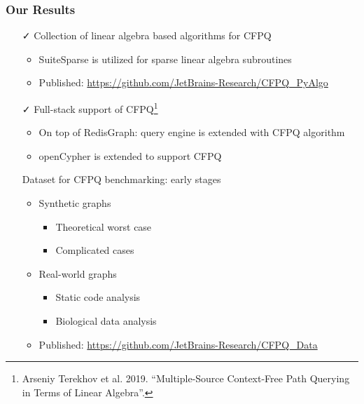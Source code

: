\documentclass[xcolor=table,aspectratio=169]{beamer}
\begin{document}
\begin{frame}[fragile]
  \frametitle{Our Results}

  \begin{itemize}
    \item[\faCheck] Collection of linear algebra based algorithms for CFPQ
    \begin{itemize}
      \item SuiteSparse is utilized for sparse linear algebra subroutines
      \item Published: \url{https://github.com/JetBrains-Research/CFPQ_PyAlgo}
    \end{itemize}
    \pause
    \item[\faCheck] Full-stack support of CFPQ\footnote{Arseniy Terekhov et al. 2019. ``Multiple-Source Context-Free Path Querying in Terms of Linear Algebra''.}    
    \begin{itemize}
      \item On top of RedisGraph: query engine is extended with CFPQ algorithm
      \item openCypher is extended to support CFPQ
    \end{itemize} 
    \pause 
    \item[\faGears] Dataset for CFPQ benchmarking: early stages 
    \begin{itemize}
      \item Synthetic graphs
      \begin{itemize}
        \item Theoretical worst case
        \item Complicated cases
      \end{itemize}
      \item Real-world graphs
      \begin{itemize}
        \item Static code analysis
        \item Biological data analysis
      \end{itemize}
      \item Published: \url{https://github.com/JetBrains-Research/CFPQ_Data} 
    \end{itemize}     
  \end{itemize}

\end{frame}
\end{document}
